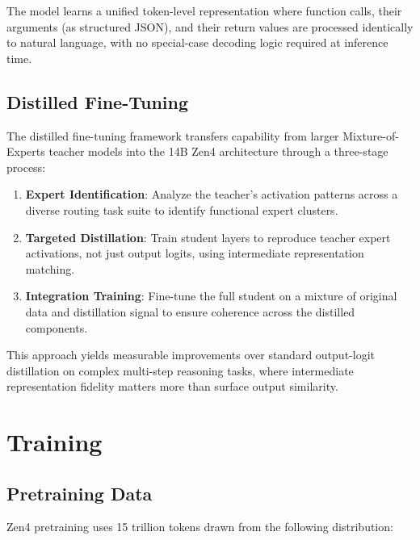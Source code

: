 \documentclass[11pt,a4paper]{article}
\begin{document}
The model learns a unified token-level representation where function calls, their arguments
(as structured JSON), and their return values are processed identically to natural language,
with no special-case decoding logic required at inference time.

\subsection{Distilled Fine-Tuning}

The distilled fine-tuning framework transfers capability from larger Mixture-of-Experts teacher
models into the 14B Zen4 architecture through a three-stage process:

\begin{enumerate}
    \item \textbf{Expert Identification}: Analyze the teacher's activation patterns across
    a diverse routing task suite to identify functional expert clusters.
    \item \textbf{Targeted Distillation}: Train student layers to reproduce teacher expert
    activations, not just output logits, using intermediate representation matching.
    \item \textbf{Integration Training}: Fine-tune the full student on a mixture of original
    data and distillation signal to ensure coherence across the distilled components.
\end{enumerate}

This approach yields measurable improvements over standard output-logit distillation on
complex multi-step reasoning tasks, where intermediate representation fidelity matters more
than surface output similarity.

\section{Training}

\subsection{Pretraining Data}

Zen4 pretraining uses 15 trillion tokens drawn from the following distribution:
\end{document}
